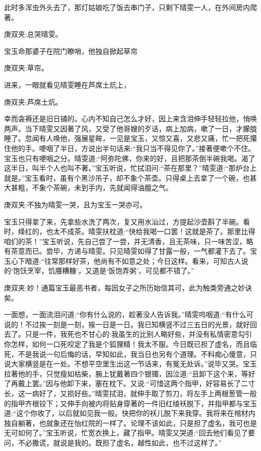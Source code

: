 \begin{parag}
    此时多浑虫外头去了，那灯姑娘吃了饭去串门子，只剩下晴雯一人，在外间房内爬著。\begin{note}庚双夹:总哭晴雯。\end{note}宝玉命那婆子在院门瞭哨，他独自掀起草帘\begin{note}庚双夹:草帘。\end{note}进来，一眼就看见晴雯睡在芦席土炕上，\begin{note}庚双夹:芦席土炕。\end{note}幸而衾褥还是旧日铺的。心内不知自己怎么才好，因上来含泪伸手轻轻拉他，悄唤两声。当下晴雯又因著了风，又受了他哥嫂的歹话，病上加病，嗽了一日，才朦胧睡了。忽闻有人唤他，强展星眸，一见是宝玉，又惊又喜，又悲又痛，忙一把死攥住他的手。哽咽了半日，方说出半句话来:“我只当不得见你了。”接著便嗽个不住。宝玉也只有哽咽之分。晴雯道:“阿弥陀佛，你来的好，且把那茶倒半碗我喝。渴了这半日，叫半个人也叫不著。”宝玉听说，忙拭泪问:“茶在那里？”晴雯道:“那炉台上就是。”宝玉看时，虽有个黑沙吊子，却不象个茶壶。只得桌上去拿了一个碗，也甚大甚粗，不象个茶碗，未到手内，先就闻得油膻之气。\begin{note}庚双夹:不独为晴雯一哭，且为宝玉一哭亦可。\end{note}宝玉只得拿了来，先拿些水洗了两次，复又用水汕过，方提起沙壶斟了半碗。看时，绛红的，也太不成茶。晴雯扶枕道:“快给我喝一口罢！这就是茶了。那里比得咱们的茶！”宝玉听说，先自己尝了一尝，并无清香，且无茶味，只一味苦涩，略有茶意而已。尝毕，方递与晴雯。只见晴雯如得了甘露一般，一气都灌下去了。宝玉心下暗道:“往常那样好茶，他尚有不如意之处；今日这样。看来，可知古人说的‘饱饫烹宰，饥餍糟糠’，又道是‘饭饱弄粥’，可见都不错了。”\begin{note}庚双夹:妙！通篇宝玉最恶书者，每因女子之所历始信其可，此为触类旁通之妙诀矣。\end{note}一面想，一面流泪问道:“你有什么说的，趁著没人告诉我。”晴雯呜咽道:“有什么可说的！不过挨一刻是一刻，挨一日是一日。我已知横竖不过三五日的光景，就好回去了。只是一件，我死也不甘心的:我虽生的比别人略好些，并没有私情密意勾引你怎样，如何一口死咬定了我是个狐狸精！我太不服。今日既已担了虚名，而且临死，不是我说一句后悔的话，早知如此，我当日也另有个道理。不料痴心傻意，只说大家横竖是在一处。不想平空里生出这一节话来，有冤无处诉。”说毕又哭。宝玉拉著他的手，只觉瘦如枯柴，腕上犹戴著四个银镯，因泣道:“且卸下这个来，等好了再戴上罢。”因与他卸下来，塞在枕下。又说:“可惜这两个指甲，好容易长了二寸长，这一病好了，又损好些。”晴雯拭泪，就伸手取了剪刀，将左手上两根葱管一般的指甲齐根铰下；又伸手向被内将贴身穿著的一件旧红绫袄脱下，并指甲都与宝玉道:“这个你收了，以后就如见我一般。快把你的袄儿脱下来我穿。我将来在棺材内独自躺著，也就象还在怡红院的一样了。论理不该如此，只是担了虚名，我可也是无可如何了。”宝玉听说，忙宽衣换上，藏了指甲。晴雯又哭道:“回去他们看见了要问，不必撒谎，就说是我的。既担了虚名，越性如此，也不过这样了。”
\end{parag}


